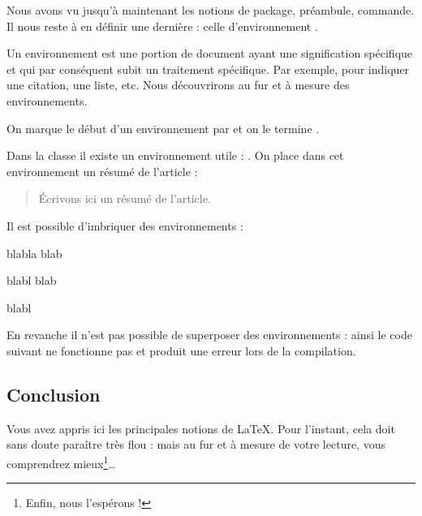 Nous avons vu jusqu'à maintenant les notions de  package, préambule, commande. 
Il nous reste à en définir une dernière  : celle d'environnement .

Un environnement  est une portion de document ayant une signification spécifique et qui par conséquent subit un traitement spécifique. Par exemple, pour indiquer une citation, une liste, etc. Nous découvrirons au fur et à mesure  des environnements. 


On marque le début d'un environnement   par  et on le termine .




Dans la classe  il existe un environnement utile : . On place dans cet environnement un résumé de l'article :

\begin{latexcode}
\begin{abstract}
Écrivons ici un résumé de l'article. 
\end{abstract}
\end{latexcode}


Il est possible d'imbriquer des environnements :

\begin{latexcode}
\begin{1}
blabla blab
\begin{2}
blabl blab
\end{2}
blabl
\end{1}
\end{latexcode}


En revanche il n'est pas possible de superposer des environnements : ainsi le code suivant ne fonctionne pas et produit une erreur lors de la compilation.



\subsection{Conclusion}

Vous avez appris ici les principales notions de \LaTeX. Pour l'instant, cela doit sans doute paraître très flou : mais au fur et à mesure de votre lecture, vous comprendrez mieux\footnote{Enfin, nous l'espérons !}\ldots


